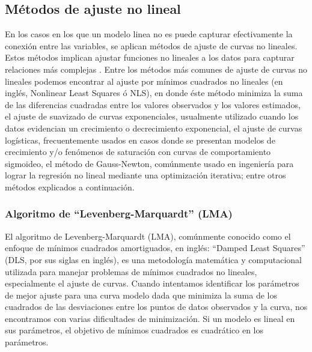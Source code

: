 \subsection{Métodos de ajuste no lineal}
En los casos en los que un modelo linea no es puede capturar efectivamente la conexión entre las variables, se aplican métodos de ajuste de curvas no lineales. Estos métodos implican ajustar funciones no lineales a los datos para capturar relaciones más complejas \cite{curvefitdalgaard}. Entre los métodos más comunes de ajuste de curvas no lineales podemos encontrar al ajuste por mínimos cuadrados no lineales (en inglés, Nonlinear Least Squares ó NLS), en donde éste método minimiza la suma de las diferencias cuadradas entre los valores observados y los valores estimados, el ajuste de suavizado de curvas exponenciales, usualmente utilizado cuando los datos evidencian un crecimiento o decrecimiento exponencial, el ajuste de curvas logísticas, frecuentemente usados en casos donde se presentan modelos de crecimiento y/o fenómenos de saturación con curvas de comportamiento sigmoideo, el método de Gauss-Newton, comúnmente usado en ingeniería para lograr la regresión no lineal mediante una optimización iterativa; entre otros métodos explicados a continuación.


\subsubsection{Algoritmo de ``Levenberg-Marquardt'' (LMA)}\label{LMAlabel}

El algoritmo de Levenberg-Marquardt (LMA), comúnmente conocido como el enfoque de mínimos cuadrados amortiguados, en inglés: ``Damped Least Squares'' (DLS, por sus siglas en inglés), es una metodología matemática y computacional utilizada para manejar problemas de mínimos cuadrados no lineales, especialmente el ajuste de curvas. Cuando intentamos identificar los parámetros de mejor ajuste para una curva modelo dada que minimiza la suma de los cuadrados de las desviaciones entre los puntos de datos observados y la curva, nos encontramos con varias dificultades de minimización. Si un modelo es lineal en sus parámetros, el objetivo de mínimos cuadrados es cuadrático en los parámetros.\\

